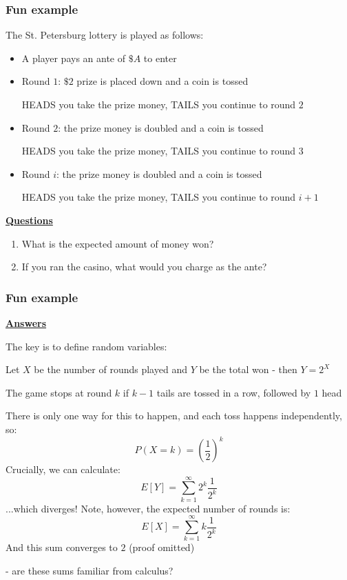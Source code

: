 \documentclass[t,8pt]{beamer}%
\begin{document}
\begin{frame}
\frametitle{Fun example}
The St. Petersburg lottery is played as follows:
\begin{itemize}
    \item A player pays an ante of $\$A$ to enter
    \item Round $1$: $\$2$ prize is placed down and a coin is tossed \par
    HEADS you take the prize money, TAILS you continue to round $2$
    \item Round $2$: the prize money is doubled and a coin is tossed \par
    HEADS you take the prize money, TAILS you continue to round $3$ 
    \item Round $i$: the prize money is doubled and a coin is tossed \par
    HEADS you take the prize money, TAILS you continue to round $i+1$
\end{itemize}
{\bf\underline{Questions}}
\begin{enumerate}
    \item What is the expected amount of money won?
    \item If you ran the casino, what would you charge as the ante?
\end{enumerate}
\end{frame}

\begin{frame}
\frametitle{Fun example}
{\bf\underline{Answers}} \par
The key is to define random variables: \par
Let $X$ be the number of rounds played and $Y$ be the total won - then $Y=2^X$ \par
The game stops at round $k$ if $k-1$ tails are tossed in a row, followed by $1$ head \par
There is only one way for this to happen, and each toss happens independently, so: 
$$P(X=k)=\left(\frac 12\right)^k$$
Crucially, we can calculate:
$$E[Y]=\sum_{k=1}^{\infty}2^k\frac 1{2^k}$$
...which diverges!
Note, however, the expected number of rounds is:
$$E[X]=\sum_{k=1}^{\infty}k\frac 1{2^k}$$
And this sum converges to $2$ (proof omitted) \par
- are these sums familiar from calculus?
\end{frame}
\end{document}
